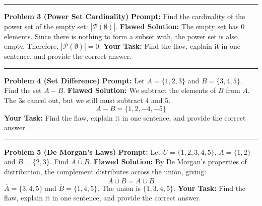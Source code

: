 \documentclass[12pt]{article}
\begin{document}
\vspace{0.3cm}
\hrule
\vspace{0.3cm}
\textbf{Problem 3 (Power Set Cardinality)}
\textbf{Prompt:} Find the cardinality of the power set of the empty set: $|\mathcal{P}(\emptyset)|$.
\textbf{Flawed Solution:} The empty set has $0$ elements. Since there is nothing to form a subset with, the power set is also empty. Therefore, $|\mathcal{P}(\emptyset)| = 0$.
\textbf{Your Task:} Find the flaw, explain it in one sentence, and provide the correct answer.

\vspace{0.3cm}
\hrule
\vspace{0.3cm}
\textbf{Problem 4 (Set Difference)}
\textbf{Prompt:} Let $A = \{1, 2, 3\}$ and $B = \{3, 4, 5\}$. Find the set $A - B$.
\textbf{Flawed Solution:} We subtract the elements of $B$ from $A$. The $3$s cancel out, but we still must subtract $4$ and $5$.
\[ A - B = \{1, 2, -4, -5\} \]
\textbf{Your Task:} Find the flaw, explain it in one sentence, and provide the correct answer.

\vspace{0.3cm}
\hrule
\vspace{0.3cm}
\textbf{Problem 5 (De Morgan's Laws)}
\textbf{Prompt:} Let $U = \{1, 2, 3, 4, 5\}$, $A = \{1, 2\}$ and $B = \{2, 3\}$. Find $\overline{A \cup B}$.
\textbf{Flawed Solution:} By De Morgan's properties of distribution, the complement distributes across the union, giving:
\[ \overline{A \cup B} = \overline{A} \cup \overline{B} \]
$\overline{A} = \{3, 4, 5\}$ and $\overline{B} = \{1, 4, 5\}$.
The union is $\{1, 3, 4, 5\}$.
\textbf{Your Task:} Find the flaw, explain it in one sentence, and provide the correct answer.
\end{document}
